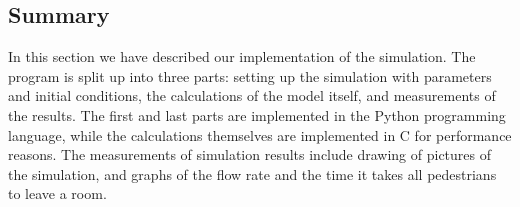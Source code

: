 \subsection{Summary}
In this section we have described our implementation of the simulation. The 
program is split up into three parts: setting up the simulation with 
parameters and initial conditions, the calculations of the model itself, and 
measurements of the results. The first and last parts are implemented in the 
Python programming language, while the calculations themselves are implemented 
in C for performance reasons. The measurements of simulation results include 
drawing of pictures of the simulation, and graphs of the flow rate and the 
time it takes all pedestrians to leave a room.
